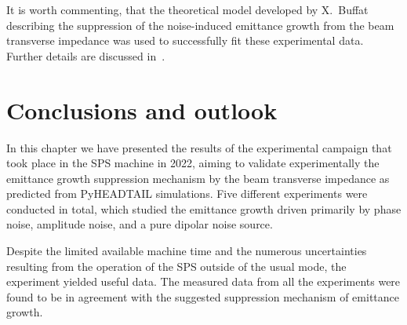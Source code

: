 It is worth commenting, that the theoretical model developed by X.~Buffat~\cite{Buffat:2022dac} describing the suppression of the noise-induced emittance growth from the beam transverse impedance was used to successfully fit these experimental data. Further details are discussed in~\cite{van_kamper_presentation_xavier_theory}.







\section{Conclusions and outlook}\label{sec:Ch8_conclusions}
In this chapter we have presented the results of the experimental campaign that took place in the SPS machine in 2022, aiming to validate experimentally the emittance growth suppression mechanism by the beam transverse impedance as predicted from PyHEADTAIL simulations. Five different experiments were conducted in total, which studied the emittance growth driven primarily by phase noise, amplitude noise, and a pure dipolar noise source. 

Despite the limited available machine time and the numerous uncertainties resulting from the operation of the SPS outside of the usual mode, the experiment yielded useful data. The measured data from all the experiments were found to be in agreement with the suggested suppression mechanism of emittance growth.

